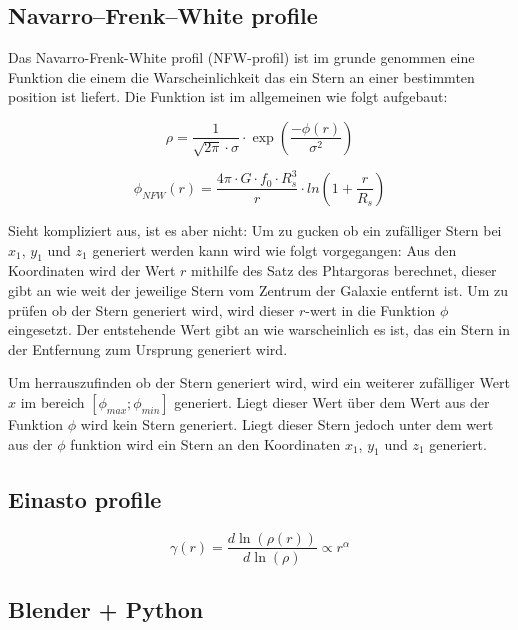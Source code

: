 \subsection{Navarro–Frenk–White profile}

Das Navarro-Frenk-White profil (NFW-profil) ist im grunde genommen eine Funktion
die einem die Warscheinlichkeit das ein Stern an einer bestimmten position ist
liefert.
Die Funktion ist im allgemeinen wie folgt aufgebaut:

\begin{equation}
  \rho = \frac{ 1 }{ \sqrt{ 2 \pi } \cdot \sigma } \cdot
  \exp \left( \frac{ -\phi(r) }{ \sigma^{ 2 } } \right)
\end{equation}

\begin{equation}
  \phi_{NFW}(r) = \frac{ 4\pi \cdot G \cdot f_{0} \cdot R_{s}^3 }{ r } \cdot
  ln{ \left( 1 + \frac{ r }{ R_{s} } \right) }
\end{equation}

Sieht kompliziert aus, ist es aber nicht: Um zu gucken ob ein zufälliger Stern
bei \( x_1 \), \( y_1 \) und \( z_1 \) generiert werden kann wird wie folgt
vorgegangen: Aus den Koordinaten wird der Wert \( r \) mithilfe des Satz des
Phtargoras berechnet, dieser gibt
an wie weit der jeweilige Stern vom Zentrum der Galaxie entfernt ist. Um zu
prüfen ob der Stern generiert wird, wird dieser \( r \)-wert in die Funktion
\( \phi \) eingesetzt. Der entstehende Wert gibt an wie warscheinlich es ist,
das ein Stern in der Entfernung zum Ursprung generiert wird.
\par
Um herrauszufinden ob der Stern generiert wird, wird ein weiterer zufälliger
Wert \( x \) im bereich \( [\phi_{max}; \phi_{min}] \) generiert. Liegt dieser
Wert über dem Wert aus der Funktion \( \phi \) wird kein Stern generiert.
Liegt dieser Stern jedoch unter dem wert aus der \( \phi \) funktion wird
ein Stern an den Koordinaten \( x_1 \), \( y_1 \) und \( z_1 \) generiert.

\subsection{Einasto profile}

\begin{equation}
  \gamma(r) = \frac{ d \ln(\rho(r)) }{ d \ln(\rho) } \propto r^{\alpha}
\end{equation}

\subsection{Blender + Python}

